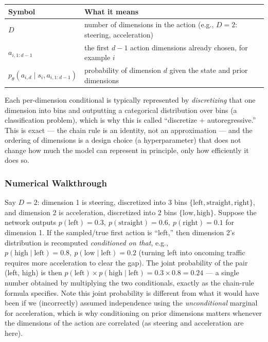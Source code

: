 \begin{center}
\begin{tabular}{@{}ll@{}}
\toprule
Symbol & What it means \\
\midrule
$D$ & number of dimensions in the action (e.g., $D=2$: steering, acceleration) \\
$a_{i,1:d-1}$ & the first $d-1$ action dimensions already chosen, for example $i$ \\
$p_\theta(a_{i,d}\mid s_i, a_{i,1:d-1})$ & probability of dimension $d$ given the state and prior dimensions \\
\bottomrule
\end{tabular}
\end{center}

Each per-dimension conditional is typically represented by \emph{discretizing} that one dimension into bins and outputting a categorical distribution over bins (a classification problem), which is why this is called ``discretize + autoregressive.'' This is exact --- the chain rule is an identity, not an approximation --- and the ordering of dimensions is a design choice (a hyperparameter) that does not change how much the model can represent in principle, only how efficiently it does so.

\subsubsection*{Numerical Walkthrough}

Say $D=2$: dimension 1 is steering, discretized into 3 bins $\{\text{left}, \text{straight}, \text{right}\}$, and dimension 2 is acceleration, discretized into 2 bins $\{\text{low}, \text{high}\}$. Suppose the network outputs $p(\text{left})=0.3,\ p(\text{straight})=0.6,\ p(\text{right})=0.1$ for dimension 1. If the sampled/true first action is ``left,'' then dimension 2's distribution is recomputed \emph{conditioned on that}, e.g., $p(\text{high} \mid \text{left}) = 0.8,\ p(\text{low}\mid\text{left}) = 0.2$ (turning left into oncoming traffic requires more acceleration to clear the gap). The joint probability of the pair (left, high) is then $p(\text{left})\times p(\text{high}\mid\text{left}) = 0.3 \times 0.8 = 0.24$ --- a single number obtained by multiplying the two conditionals, exactly as the chain-rule formula specifies. Note this joint probability is different from what it would have been if we (incorrectly) assumed independence using the \emph{unconditional} marginal for acceleration, which is why conditioning on prior dimensions matters whenever the dimensions of the action are correlated (as steering and acceleration are here).
